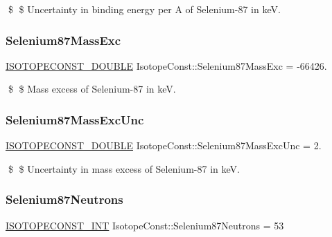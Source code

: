 \$ \$ Uncertainty in binding energy per A of Selenium-\/87 in keV. \mbox{\label{group___isotope_const-_selenium-_se87_gad947dff19b705fae9ceb805f2832c4ef}} 
\subsubsection{\texorpdfstring{Selenium87\+Mass\+Exc}{Selenium87MassExc}}
{\footnotesize\ttfamily \mbox{\hyperlink{group___isotope_const-_macros_ga8f45a7272ce02c0b4c65c44636ed719a}{I\+S\+O\+T\+O\+P\+E\+C\+O\+N\+S\+T\+\_\+\+D\+O\+U\+B\+LE}} Isotope\+Const\+::\+Selenium87\+Mass\+Exc = -\/66426.}

\$ \$ Mass excess of Selenium-\/87 in keV. \mbox{\label{group___isotope_const-_selenium-_se87_gaab81e99031118309baab9f1d2d8d2784}} 
\subsubsection{\texorpdfstring{Selenium87\+Mass\+Exc\+Unc}{Selenium87MassExcUnc}}
{\footnotesize\ttfamily \mbox{\hyperlink{group___isotope_const-_macros_ga8f45a7272ce02c0b4c65c44636ed719a}{I\+S\+O\+T\+O\+P\+E\+C\+O\+N\+S\+T\+\_\+\+D\+O\+U\+B\+LE}} Isotope\+Const\+::\+Selenium87\+Mass\+Exc\+Unc = 2.}

\$ \$ Uncertainty in mass excess of Selenium-\/87 in keV. \mbox{\label{group___isotope_const-_selenium-_se87_ga31454afb7fc1f62615f207b95c50bda7}} 
\subsubsection{\texorpdfstring{Selenium87\+Neutrons}{Selenium87Neutrons}}
{\footnotesize\ttfamily \mbox{\hyperlink{group___isotope_const-_macros_ga5f18360b3e99483a35c32d789e62621c}{I\+S\+O\+T\+O\+P\+E\+C\+O\+N\+S\+T\+\_\+\+I\+NT}} Isotope\+Const\+::\+Selenium87\+Neutrons = 53}

